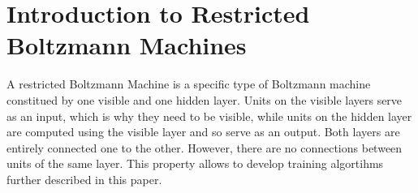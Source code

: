 \documentclass{report}
\begin{document}
	
	
	
	
	
	\section{Introduction to Restricted Boltzmann Machines}
	
	A restricted Boltzmann Machine is a specific type of Boltzmann machine 
	constitued by one visible and one hidden layer. Units on the visible layers serve as 
	an input, which is why they need to be visible, while units on the hidden layer are computed using the visible layer and so serve as an output. 
	Both layers are entirely connected one to the other. However, there are no 
	connections between units of the same layer. This property allows to 
	develop training algortihms further described in this paper.
	
\end{document}
